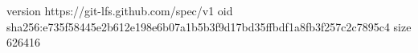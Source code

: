 version https://git-lfs.github.com/spec/v1
oid sha256:e735f58445e2b612e198e6b07a1b5b3f9d17bd35ffbdf1a8fb3f257c2c7895c4
size 626416

